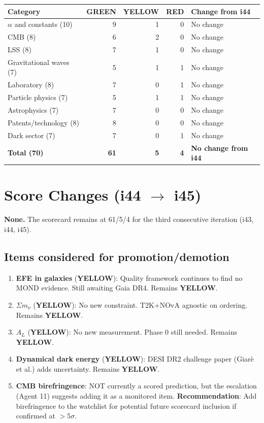 \documentclass[11pt,a4paper]{article}
\newcommand{\GREEN}{\textcolor{dfdgreen}{\textbf{GREEN}}}
\newcommand{\YELLOW}{\textcolor{dfdyellow}{\textbf{YELLOW}}}
\newcommand{\RED}{\textcolor{dfdred}{\textbf{RED}}}
\begin{document}
\begin{center}
\begin{tabular}{lrrrl}
\toprule
\textbf{Category} & \textbf{\GREEN} & \textbf{\YELLOW} & \textbf{\RED} & \textbf{Change from i44} \\
\midrule
$\alpha$ and constants (10) & 9 & 1 & 0 & No change \\
CMB (8) & 6 & 2 & 0 & No change \\
LSS (8) & 7 & 1 & 0 & No change \\
Gravitational waves (7) & 5 & 1 & 1 & No change \\
Laboratory (8) & 7 & 0 & 1 & No change \\
Particle physics (7) & 5 & 1 & 1 & No change \\
Astrophysics (7) & 7 & 0 & 0 & No change \\
Patents/technology (8) & 8 & 0 & 0 & No change \\
Dark sector (7) & 7 & 0 & 1 & No change \\
\midrule
\textbf{Total (70)} & \textbf{61} & \textbf{5} & \textbf{4} & \textbf{No change from i44} \\
\bottomrule
\end{tabular}
\end{center}

\section{Score Changes (i44 $\to$ i45)}

\textbf{None.} The scorecard remains at 61/5/4 for the third consecutive iteration (i43, i44, i45).

\subsection{Items considered for promotion/demotion}

\begin{enumerate}
\item \textbf{EFE in galaxies} (\YELLOW): Quality framework continues to find no MOND evidence. Still awaiting Gaia DR4. Remains \YELLOW.
\item \textbf{$\Sigma m_\nu$} (\YELLOW): No new constraint. T2K+NOvA agnostic on ordering. Remains \YELLOW.
\item \textbf{$A_L$} (\YELLOW): No new measurement. Phase 0 still needed. Remains \YELLOW.
\item \textbf{Dynamical dark energy} (\YELLOW): DESI DR2 challenge paper (Giar\`e et al.) adds uncertainty. Remains \YELLOW.
\item \textbf{CMB birefringence}: NOT currently a scored prediction, but the escalation (Agent 11) suggests adding it as a monitored item. \textbf{Recommendation}: Add birefringence to the watchlist for potential future scorecard inclusion if confirmed at $> 5\sigma$.
\end{enumerate}
\end{document}

